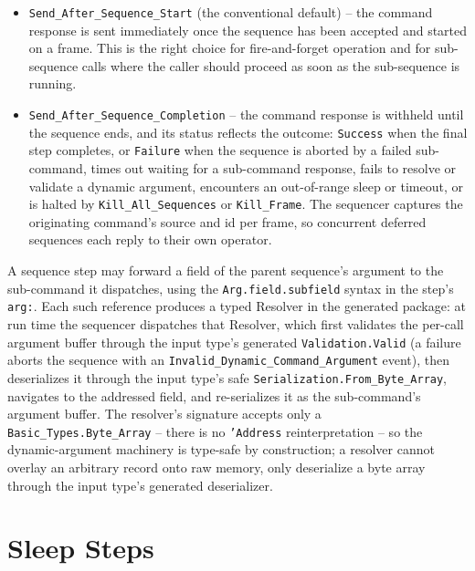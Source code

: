 \begin{itemize}
  \item \texttt{Send\_After\_Sequence\_Start} (the conventional default) -- the command response is sent immediately once the sequence has been accepted and started on a frame. This is the right choice for fire-and-forget operation and for sub-sequence calls where the caller should proceed as soon as the sub-sequence is running.
  \item \texttt{Send\_After\_Sequence\_Completion} -- the command response is withheld until the sequence ends, and its status reflects the outcome: \texttt{Success} when the final step completes, or \texttt{Failure} when the sequence is aborted by a failed sub-command, times out waiting for a sub-command response, fails to resolve or validate a dynamic argument, encounters an out-of-range sleep or timeout, or is halted by \texttt{Kill\_All\_Sequences} or \texttt{Kill\_Frame}. The sequencer captures the originating command's source and id per frame, so concurrent deferred sequences each reply to their own operator.
\end{itemize}

A sequence step may forward a field of the parent sequence's argument to the sub-command it dispatches, using the \texttt{Arg.field.subfield} syntax in the step's \texttt{arg:}. Each such reference produces a typed Resolver in the generated package: at run time the sequencer dispatches that Resolver, which first validates the per-call argument buffer through the input type's generated \texttt{Validation.Valid} (a failure aborts the sequence with an \texttt{Invalid\_Dynamic\_Command\_Argument} event), then deserializes it through the input type's safe \texttt{Serialization.From\_Byte\_Array}, navigates to the addressed field, and re-serializes it as the sub-command's argument buffer. The resolver's signature accepts only a \texttt{Basic\_Types.Byte\_Array} -- there is no \texttt{'Address} reinterpretation -- so the dynamic-argument machinery is type-safe by construction; a resolver cannot overlay an arbitrary record onto raw memory, only deserialize a byte array through the input type's generated deserializer.

\section{Sleep Steps}

